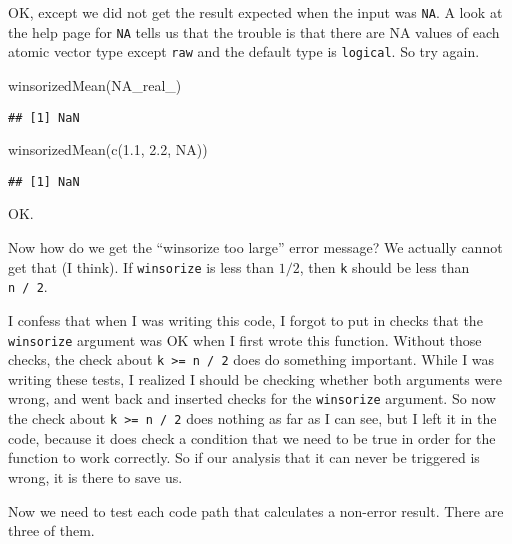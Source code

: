 \documentclass[
]{article}
\newenvironment{Shaded}{\begin{snugshade}}{\end{snugshade}}
\newcommand{\ConstantTok}[1]{\textcolor[rgb]{0.00,0.00,0.00}{#1}}
\newcommand{\FloatTok}[1]{\textcolor[rgb]{0.00,0.00,0.81}{#1}}
\newcommand{\FunctionTok}[1]{\textcolor[rgb]{0.00,0.00,0.00}{#1}}
\newcommand{\NormalTok}[1]{#1}
\begin{document}
OK, except we did not get the result expected when the input was
\texttt{NA}. A look at the help page for \texttt{NA} tells us that the
trouble is that there are NA values of each atomic vector type except
\texttt{raw} and the default type is \texttt{logical}. So try again.

\begin{Shaded}
\begin{Highlighting}[]
\FunctionTok{winsorizedMean}\NormalTok{(}\ConstantTok{NA\_real\_}\NormalTok{)}
\end{Highlighting}
\end{Shaded}

\begin{verbatim}
## [1] NaN
\end{verbatim}

\begin{Shaded}
\begin{Highlighting}[]
\FunctionTok{winsorizedMean}\NormalTok{(}\FunctionTok{c}\NormalTok{(}\FloatTok{1.1}\NormalTok{, }\FloatTok{2.2}\NormalTok{, }\ConstantTok{NA}\NormalTok{))}
\end{Highlighting}
\end{Shaded}

\begin{verbatim}
## [1] NaN
\end{verbatim}

OK.

Now how do we get the ``winsorize too large'' error message? We actually
cannot get that (I think). If \texttt{winsorize} is less than \(1/2\),
then \texttt{k} should be less than \texttt{n\ /\ 2}.

I confess that when I was writing this code, I forgot to put in checks
that the \texttt{winsorize} argument was OK when I first wrote this
function. Without those checks, the check about
\texttt{k\ \textgreater{}=\ n\ /\ 2} does do something important. While
I was writing these tests, I realized I should be checking whether both
arguments were wrong, and went back and inserted checks for the
\texttt{winsorize} argument. So now the check about
\texttt{k\ \textgreater{}=\ n\ /\ 2} does nothing as far as I can see,
but I left it in the code, because it does check a condition that we
need to be true in order for the function to work correctly. So if our
analysis that it can never be triggered is wrong, it is there to save
us.

Now we need to test each code path that calculates a non-error result.
There are three of them.
\end{document}
